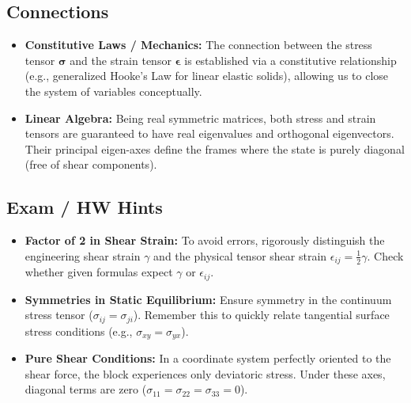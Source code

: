 \subsection*{Connections}
\begin{itemize}
    \item \textbf{Constitutive Laws / Mechanics:} The connection between the stress tensor $\mathbf{\sigma}$ and the strain tensor $\mathbf{\epsilon}$ is established via a constitutive relationship (e.g., generalized Hooke's Law for linear elastic solids), allowing us to close the system of variables conceptually.
    \item \textbf{Linear Algebra:} Being real symmetric matrices, both stress and strain tensors are guaranteed to have real eigenvalues and orthogonal eigenvectors. Their principal eigen-axes define the frames where the state is purely diagonal (free of shear components).
\end{itemize}

\subsection*{Exam / HW Hints}
\begin{itemize}
    \item \textbf{Factor of 2 in Shear Strain:} To avoid errors, rigorously distinguish the engineering shear strain $\gamma$ and the physical tensor shear strain $\epsilon_{ij} = \frac{1}{2}\gamma$. Check whether given formulas expect $\gamma$ or $\epsilon_{ij}$.
    \item \textbf{Symmetries in Static Equilibrium:} Ensure symmetry in the continuum stress tensor ($\sigma_{ij} = \sigma_{ji}$). Remember this to quickly relate tangential surface stress conditions (e.g., $\sigma_{xy} = \sigma_{yx}$).
    \item \textbf{Pure Shear Conditions:} In a coordinate system perfectly oriented to the shear force, the block experiences only deviatoric stress. Under these axes, diagonal terms are zero ($\sigma_{11} = \sigma_{22} = \sigma_{33} = 0$).
\end{itemize}
